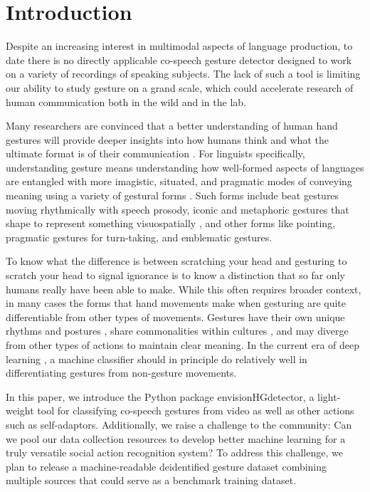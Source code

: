\documentclass[12pt,a4paper]{article}
\begin{document}
\newpage

\section{Introduction}
Despite an increasing interest in multimodal aspects of language production, to date there is no directly applicable co-speech gesture detector designed to work on a variety of recordings of speaking subjects. The lack of such a tool is limiting our ability to study gesture on a grand scale, which could accelerate research of human communication both in the wild and in the lab.

Many researchers are convinced that a better understanding of human hand gestures will provide deeper insights into how humans think and what the ultimate format is of their communication \citep{feyereisenCognitivePsychologySpeechrelated2017, kendonGestureVisibleAction2004, mcneillHandMindWhat1992, goldin-meadowGestureSignLanguage2017}. For linguists specifically, understanding gesture means understanding how well-formed aspects of languages are entangled with more imagistic, situated, and pragmatic modes of conveying meaning using a variety of gestural forms \cite{alviarMultimodalCoordinationPragmatic2023, murgianoSituatingLanguageRealworld2021}. Such forms include beat gestures moving rhythmically with speech prosody, iconic and metaphoric gestures that shape to represent something visuospatially \citep{streeckDepictingGesture2008}, and other forms like pointing, pragmatic gestures for turn-taking, and emblematic gestures.

To know what the difference is between scratching your head and gesturing to scratch your head to signal ignorance is to know a distinction that so far only humans really have been able to make. While this often requires broader context, in many cases the forms that hand movements make when gesturing are quite differentiable from other types of movements. Gestures have their own unique rhythms and postures \cite{pouwEntrainmentModulationGesture2019, streeckDepictingGesture2008, morgensternTheeSingOpening2021}, share commonalities within cultures \cite{kendonGestureVisibleAction2004}, and may diverge from other types of actions to maintain clear meaning. In the current era of deep learning \citep{sieversDeepSocialNeuroscience2024}, a machine classifier should in principle do relatively well in differentiating gestures from non-gesture movements.

In this paper, we introduce the Python package envisionHGdetector, a light-weight tool for classifying co-speech gestures from video as well as other actions such as self-adaptors. Additionally, we raise a challenge to the community: Can we pool our data collection resources to develop better machine learning for a truly versatile social action recognition system? To address this challenge, we plan to release a machine-readable deidentified gesture dataset combining multiple sources that could serve as a benchmark training dataset.
\end{document}
